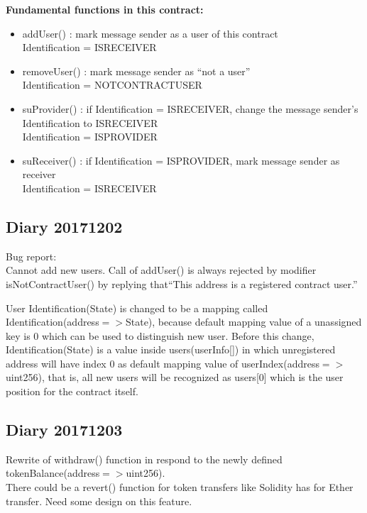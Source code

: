 \textbf{Fundamental functions in this contract:}
\begin{itemize}
    \item addUser() : mark message sender as a user of this contract\\
    Identification = ISRECEIVER
    \item removeUser() : mark message sender as ``not a user''\\
    Identification = NOTCONTRACTUSER
    \item suProvider() : if Identification = ISRECEIVER, change the message sender's Identification to ISRECEIVER\\
    Identification = ISPROVIDER
    \item suReceiver() : if Identification = ISPROVIDER, mark message sender as receiver\\
    Identification = ISRECEIVER
\end{itemize}
\subsection{Diary 20171202}
Bug report:\\
Cannot add new users. Call of addUser() is always rejected by modifier isNotContractUser() by 
replying that``This address is a registered contract user.''

User Identification(State) is changed to be a mapping called Identification(address$=>$State),
because default mapping value of a unassigned key is 0 which can be used to distinguish new user.
Before this change, Identification(State) is a value inside users(userInfo[]) in which
unregistered address will have index 0 as default mapping value of userIndex(address$=>$uint256),
that is, all new users will be recognized as users[0] which is the user position for the contract itself.
\subsection{Diary 20171203}
Rewrite of withdraw() function in respond to the newly defined tokenBalance(address$=>$uint256).\\
There could be a revert() function for token transfers like Solidity has for Ether transfer.
Need some design on this feature.
